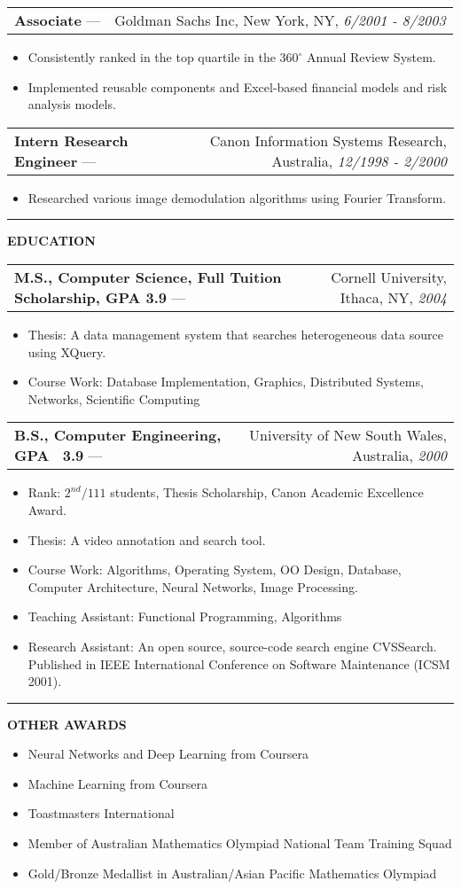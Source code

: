\documentclass[11pt]{article}
\makeatletter
\newcommand{\resheading}[1]{\vspace{1pt}\textbf{#1}}
\newcommand{\ressubheading}[4]{\vspace{6pt}
    \begin{tabular*}{\textwidth}{@{}l@{\extracolsep{\fill}}r@{}}
        \textbf{#1} --- & #3, #2, \textit{#4} \\
\end{tabular*}}
\newcommand{\resitem}[1]{\item #1}
\newcommand{\ressep}{\vspace{4pt}\hrule\vspace{4pt}}
\makeatother
\begin{document}
\ressubheading{Associate}{New York, NY}{Goldman Sachs Inc}{6/2001 - 8/2003}
\begin{itemize}
\resitem{Consistently ranked in the top quartile in the $360^{\circ}$ Annual Review System.}
\resitem{Implemented reusable components and Excel-based financial models and risk analysis models.}
\end{itemize}

\ressubheading{Intern Research Engineer}{Australia}{Canon Information Systems Research}{12/1998 - 2/2000}
\begin{itemize}
\resitem{Researched various image demodulation algorithms using Fourier Transform.}
\end{itemize}

\ressep{}
\resheading{EDUCATION}

\ressubheading{M.S., Computer Science, Full Tuition Scholarship, GPA 3.9}{Ithaca, NY}{Cornell University}{2004}
\begin{itemize}
\resitem{Thesis: A data management system that searches heterogeneous data source using XQuery.}
\resitem{Course Work: Database Implementation, Graphics, Distributed Systems, Networks, Scientific Computing}
\end{itemize}

\ressubheading{B.S., Computer Engineering, GPA ~3.9}{Australia}{University of New South Wales}{2000}
\begin{itemize}
\resitem{Rank: $2^{nd}/111$ students, Thesis Scholarship, Canon Academic Excellence Award.}
\resitem{Thesis: A video annotation and search tool.}
\resitem{Course Work: Algorithms, Operating System, OO Design, Database, Computer Architecture, Neural Networks, Image Processing.}
\resitem{Teaching Assistant: Functional Programming, Algorithms}
\resitem{Research Assistant: An open source, source-code search engine CVSSearch. Published in IEEE International Conference on Software Maintenance (ICSM 2001).}
\end{itemize}

\ressep{}
\resheading{OTHER AWARDS}

\begin{itemize}
\resitem{Neural Networks and Deep Learning from Coursera}
\resitem{Machine Learning from Coursera}
\resitem{Toastmasters International}
\resitem{Member of Australian Mathematics Olympiad National Team Training Squad}
\resitem{Gold/Bronze Medallist in Australian/Asian Pacific Mathematics Olympiad}
\end{itemize}
\end{document}
